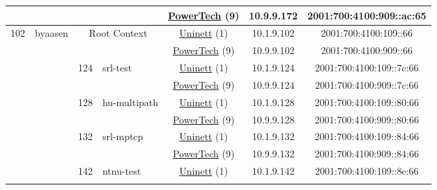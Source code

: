 \begin{small}
\begin{center}
\begin{longtable}{|c|c|c|c|c|c|c|c|}
  &  &  &  & \multicolumn{2}{|c|}{\tiny{\href{http://www.powertech.no}{PowerTech} (9)}} & \tiny{10.9.9.172} & \tiny{2001:700:4100:909::ac:65} \\ \hline
 \multirow{20}{*}{\tiny{102}} & \multicolumn{1}{|l|}{\multirow{20}{*}{\tiny{byaasen}}} & \multicolumn{2}{|c|}{\multirow{2}{*}{\tiny{Root Context}}} & \multicolumn{2}{|c|}{\tiny{\href{https://www.uninett.no}{Uninett} (1)}} & \tiny{10.1.9.102} & \tiny{2001:700:4100:109::66} \\* \cline{5-5}\cline{6-6}\cline{7-7}\cline{8-8}
  &  & \multicolumn{2}{|c|}{} & \multicolumn{2}{|c|}{\tiny{\href{http://www.powertech.no}{PowerTech} (9)}} & \tiny{10.9.9.102} & \tiny{2001:700:4100:909::66} \\* \cline{3-3}\cline{4-4}\cline{5-5}\cline{6-6}\cline{7-7}\cline{8-8}
  &  & \multirow{2}{*}{\tiny{124}} & \multicolumn{1}{|l|}{\multirow{2}{*}{\tiny{srl-test}}} & \multicolumn{2}{|c|}{\tiny{\href{https://www.uninett.no}{Uninett} (1)}} & \tiny{10.1.9.124} & \tiny{2001:700:4100:109::7c:66} \\* \cline{5-5}\cline{6-6}\cline{7-7}\cline{8-8}
  &  &  &  & \multicolumn{2}{|c|}{\tiny{\href{http://www.powertech.no}{PowerTech} (9)}} & \tiny{10.9.9.124} & \tiny{2001:700:4100:909::7c:66} \\* \cline{3-3}\cline{4-4}\cline{5-5}\cline{6-6}\cline{7-7}\cline{8-8}
  &  & \multirow{2}{*}{\tiny{128}} & \multicolumn{1}{|l|}{\multirow{2}{*}{\tiny{hu-multipath}}} & \multicolumn{2}{|c|}{\tiny{\href{https://www.uninett.no}{Uninett} (1)}} & \tiny{10.1.9.128} & \tiny{2001:700:4100:109::80:66} \\* \cline{5-5}\cline{6-6}\cline{7-7}\cline{8-8}
  &  &  &  & \multicolumn{2}{|c|}{\tiny{\href{http://www.powertech.no}{PowerTech} (9)}} & \tiny{10.9.9.128} & \tiny{2001:700:4100:909::80:66} \\* \cline{3-3}\cline{4-4}\cline{5-5}\cline{6-6}\cline{7-7}\cline{8-8}
  &  & \multirow{2}{*}{\tiny{132}} & \multicolumn{1}{|l|}{\multirow{2}{*}{\tiny{srl-mptcp}}} & \multicolumn{2}{|c|}{\tiny{\href{https://www.uninett.no}{Uninett} (1)}} & \tiny{10.1.9.132} & \tiny{2001:700:4100:109::84:66} \\* \cline{5-5}\cline{6-6}\cline{7-7}\cline{8-8}
  &  &  &  & \multicolumn{2}{|c|}{\tiny{\href{http://www.powertech.no}{PowerTech} (9)}} & \tiny{10.9.9.132} & \tiny{2001:700:4100:909::84:66} \\* \cline{3-3}\cline{4-4}\cline{5-5}\cline{6-6}\cline{7-7}\cline{8-8}
  &  & \multirow{2}{*}{\tiny{142}} & \multicolumn{1}{|l|}{\multirow{2}{*}{\tiny{ntnu-test}}} & \multicolumn{2}{|c|}{\tiny{\href{https://www.uninett.no}{Uninett} (1)}} & \tiny{10.1.9.142} & \tiny{2001:700:4100:109::8e:66} \\* \cline{5-5}\cline{6-6}\cline{7-7}\cline{8-8}

\end{longtable}
\end{center}
\end{small}
